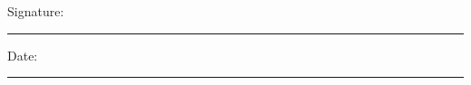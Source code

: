 \documentclass[11pt,oneside]{book}
\begin{document}
\noindent Signature:\\[1mm]
\rule[1em]{25em}{0.5pt}

\noindent Date:\\[1mm]
\rule[1em]{25em}{0.5pt}



\tableofcontents


\mainmatter





 
 
\end{document}
